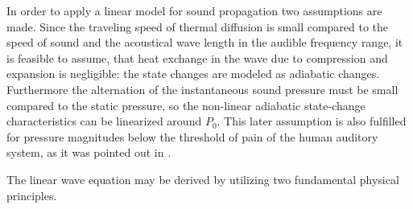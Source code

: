 In order to apply a linear model for sound propagation two assumptions are made.
Since the traveling speed of thermal diffusion is small compared to the speed of sound and the acoustical wave length in the audible frequency range, it is feasible to assume, that heat exchange in the wave due to compression and expansion is negligible: the state changes are modeled as adiabatic changes.
Furthermore the alternation of the instantaneous sound pressure must be small compared to the static pressure, so the non-linear adiabatic state-change characteristics can be linearized around $P_0$. This later assumption is also fulfilled for pressure magnitudes below the threshold of pain of the human auditory system, as it was pointed out in \cite{Gumerov2004, Ahrens2012}.
%

The linear wave equation may be derived by utilizing two fundamental physical principles.
